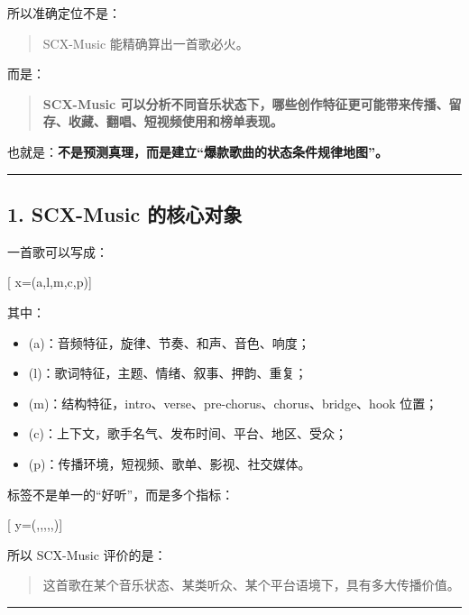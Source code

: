 \documentclass[
  12pt,
]{ctexart}
\providecommand{\tightlist}{%
  \setlength{\itemsep}{0pt}\setlength{\parskip}{0pt}}
\begin{document}
所以准确定位不是：

\begin{quote}
SCX-Music 能精确算出一首歌必火。
\end{quote}

而是：

\begin{quote}
\textbf{SCX-Music
可以分析不同音乐状态下，哪些创作特征更可能带来传播、留存、收藏、翻唱、短视频使用和榜单表现。}
\end{quote}

也就是：\textbf{不是预测真理，而是建立``爆款歌曲的状态条件规律地图''。}

\begin{center}\rule{0.5\linewidth}{0.5pt}\end{center}

\subsection{1. SCX-Music
的核心对象}\label{scx-music-ux7684ux6838ux5fc3ux5bf9ux8c61}

一首歌可以写成：

{[} x=(a,l,m,c,p){]}

其中：

\begin{itemize}
\tightlist
\item
  (a)：音频特征，旋律、节奏、和声、音色、响度；
\item
  (l)：歌词特征，主题、情绪、叙事、押韵、重复；
\item
  (m)：结构特征，intro、verse、pre-chorus、chorus、bridge、hook 位置；
\item
  (c)：上下文，歌手名气、发布时间、平台、地区、受众；
\item
  (p)：传播环境，短视频、歌单、影视、社交媒体。
\end{itemize}

标签不是单一的``好听''，而是多个指标：

{[}
y=(,,,,,){]}

所以 SCX-Music 评价的是：

\begin{quote}
这首歌在某个音乐状态、某类听众、某个平台语境下，具有多大传播价值。
\end{quote}

\begin{center}\rule{0.5\linewidth}{0.5pt}\end{center}
\end{document}
